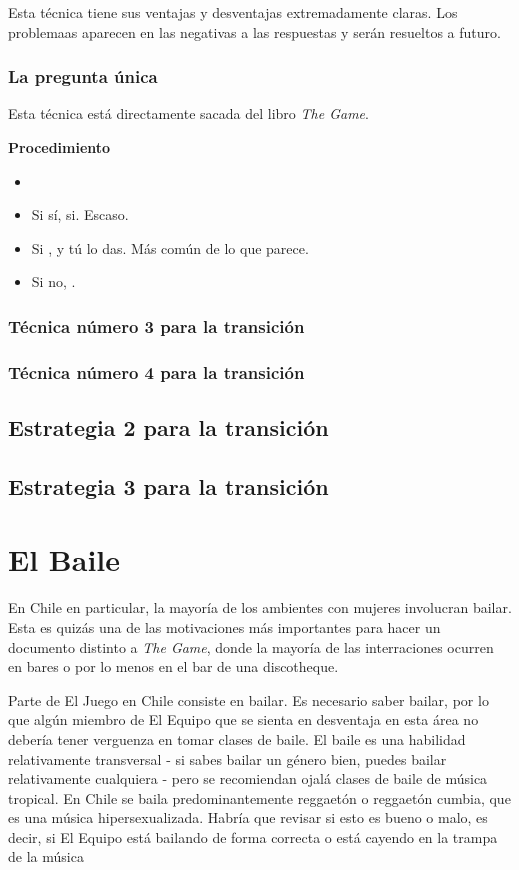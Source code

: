 \documentclass{article}
\begin{document}
Esta técnica tiene sus ventajas y desventajas extremadamente claras. Los problemaas aparecen en las negativas a las respuestas y serán resueltos a futuro.

\subsubsection{La pregunta única}
Esta técnica está directamente sacada del libro \textit{The Game}.

\textbf{Procedimiento}
\begin{itemize}
\item {}
\item Si sí, si. Escaso.
\item Si ,  y tú lo das. Más común de lo que parece.
\item Si no, . 
\end{itemize}

\subsubsection{Técnica número 3 para la transición}

\subsubsection{Técnica número 4 para la transición}

\subsection{Estrategia 2 para la transición}
\subsection{Estrategia 3 para la transición}
\section{El Baile \label{sec:elBaile}}
En Chile en particular, la mayoría de los ambientes con mujeres involucran bailar. Esta es quizás una de las motivaciones más importantes para hacer un documento distinto a \textit{The Game}, donde la mayoría de las interraciones ocurren en bares o por lo menos en el bar de una discotheque.

Parte de El Juego en Chile consiste en bailar. Es necesario saber bailar, por lo que algún miembro de El Equipo que se sienta en desventaja en esta área no debería tener verguenza en tomar clases de baile. El baile es una habilidad relativamente transversal - si sabes bailar un género bien, puedes bailar relativamente cualquiera - pero se recomiendan ojalá clases de baile de música tropical. En Chile se baila predominantemente reggaetón o reggaetón cumbia, que es una música hipersexualizada. {\color{red} Habría que revisar si esto es bueno o malo, es decir, si El Equipo está bailando de forma correcta o está cayendo en la trampa de la música}
\end{document}
